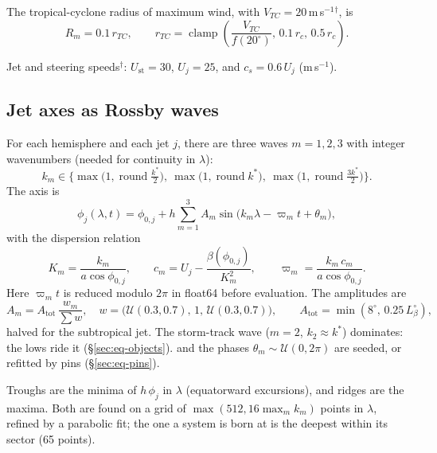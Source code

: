 \documentclass[11pt,a4paper]{article}
\begin{document}
The tropical-cyclone radius of maximum wind, with $V_{TC}=20$\,m\,s$^{-1}$$^\dagger$, is
\begin{equation}
  R_m = 0.1\,r_{TC},\qquad
  r_{TC}=\operatorname{clamp}\!\left(\frac{V_{TC}}{f(20^\circ)},\,0.1\,r_c,\,0.5\,r_c\right).
\end{equation}

Jet and steering speeds$^\dagger$: $U_{\mathrm{st}}=30$, $U_j=25$, and
$c_s=0.6\,U_j$ (m\,s$^{-1}$).

\subsection{Jet axes as Rossby waves}
\label{sec:eq-jets}
For each hemisphere and each jet $j$, there are three waves $m=1,2,3$ with integer
wavenumbers (needed for continuity in $\lambda$):
\begin{equation}
  k_m\in\Big\{\max\!\big(1,\operatorname{round}\tfrac{k^*}{2}\big),\
  \max\!\big(1,\operatorname{round}k^*\big),\
  \max\!\big(1,\operatorname{round}\tfrac{3k^*}{2}\big)\Big\}.
\end{equation}
The axis is
\begin{equation}
  \phi_j(\lambda,t)=\phi_{0,j}+h\sum_{m=1}^{3}A_m\sin\!\big(k_m\lambda-\varpi_m t+\theta_m\big),
\end{equation}
with the dispersion relation \cite{rossby1939}
\begin{equation}
  K_m=\frac{k_m}{a\cos\phi_{0,j}},\qquad
  c_m = U_j-\frac{\beta(\phi_{0,j})}{K_m^2},\qquad
  \varpi_m = \frac{k_m\,c_m}{a\cos\phi_{0,j}}.
\end{equation}
Here $\varpi_m t$ is reduced modulo $2\pi$ in float64 before evaluation. The amplitudes are
\begin{equation}
  A_m = A_{\mathrm{tot}}\,\frac{w_m}{\sum w},\quad
  w=\big(\mathcal{U}(0.3,0.7),\,1,\,\mathcal{U}(0.3,0.7)\big),\qquad
  A_{\mathrm{tot}}=\min(8^\circ,\,0.25\,L_\beta^\circ),
\end{equation}
halved for the subtropical jet. The storm-track wave ($m=2$, $k_2\approx k^*$) dominates: the
lows ride it (\S\ref{sec:eq-objects}).
and the phases $\theta_m\sim\mathcal{U}(0,2\pi)$ are seeded, or refitted by pins
(\S\ref{sec:eq-pins}).

Troughs are the minima of $h\,\phi_j$ in $\lambda$ (equatorward excursions), and ridges are the
maxima. Both are found on a grid of $\max(512,16\max_m k_m)$ points in $\lambda$, refined by a
parabolic fit; the one a system is born at is the deepest within its sector (65 points).
\end{document}
